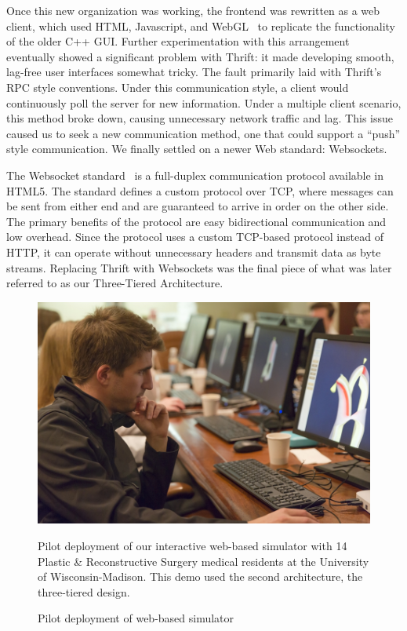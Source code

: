  Once this new organization was working, the frontend was rewritten as
 a web client, which used HTML, Javascript, and WebGL~\citep{webgl1.0}
 to replicate the functionality of the older C++ GUI. Further
 experimentation with this arrangement eventually showed a significant
 problem with Thrift: it made developing smooth, lag-free user
 interfaces somewhat tricky. The fault primarily laid with Thrift's
 RPC style conventions. Under this communication style, a client would
 continuously poll the server for new information. Under a multiple
 client scenario, this method broke down, causing unnecessary network
 traffic and lag.  This issue caused us to seek a new communication
 method, one that could support a ``push'' style communication. We
 finally settled on a newer Web standard: Websockets.

 The Websocket standard~\citep{rfc6455} is a full-duplex communication protocol
 available in HTML5. The standard defines a custom protocol over TCP, where
 messages can be sent from either end and are guaranteed to
 arrive in order on the other side. The primary benefits of the
 protocol are easy bidirectional communication and low overhead. Since
 the protocol uses a custom TCP-based protocol instead of HTTP, it can
 operate without unnecessary headers and transmit data as byte streams.
 Replacing Thrift with Websockets was the final piece of what was
 later referred to as our Three-Tiered Architecture.


\begin{figure}[t]
\includegraphics[width=\columnwidth]{chapter_gridiron/images/CS_SurgerySim.jpg}

\caption{Pilot deployment of web-based simulator}{Pilot deployment of
  our interactive web-based simulator with 14 Plastic \&
  Reconstructive Surgery medical residents at the University of
  Wisconsin-Madison. This demo used the second architecture, the
  three-tiered design.}

\label{fig:pilot}
\end{figure}
 
